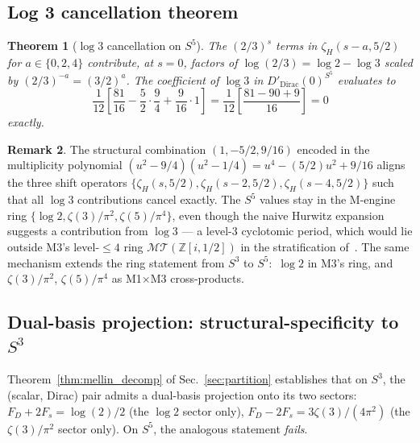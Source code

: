 \documentclass[11pt,a4paper]{article}
\theoremstyle{plain}
\newtheorem{theorem}{Theorem}[section]
\theoremstyle{definition}
\newtheorem{remark}[theorem]{Remark}
\newcommand{\Z}{\mathbb{Z}}
\begin{document}
\subsection{Log 3 cancellation theorem}

\begin{theorem}[$\log 3$ cancellation on $S^{5}$]
\label{thm:log3_cancellation}
The $(2/3)^{s}$ terms in $\zeta_{H}(s - a, 5/2)$ for
$a \in \{0, 2, 4\}$ contribute, at $s = 0$, factors of
$\log(2/3) = \log 2 - \log 3$ scaled by $(2/3)^{-a} = (3/2)^{a}$. The
coefficient of $\log 3$ in $D'_\text{Dirac}(0)^{S^{5}}$ evaluates to
\begin{equation}
\frac{1}{12}\left[\frac{81}{16} - \frac{5}{2}\cdot\frac{9}{4} + \frac{9}{16}\cdot 1\right]
= \frac{1}{12}\left[\frac{81 - 90 + 9}{16}\right] = 0
\end{equation}
exactly.
\end{theorem}

\begin{remark}
The structural combination $(1, -5/2, 9/16)$ encoded in the
multiplicity polynomial $(u^{2} - 9/4)(u^{2} - 1/4) = u^{4} - (5/2) u^{2} + 9/16$
aligns the three shift operators $\{\zeta_{H}(s, 5/2),
\zeta_{H}(s-2, 5/2), \zeta_{H}(s-4, 5/2)\}$ such that all $\log 3$
contributions cancel exactly. The $S^{5}$ values stay in the M-engine ring $\{\log 2, \zeta(3)/\pi^{2},
\zeta(5)/\pi^{4}\}$, even though the naive Hurwitz expansion suggests
a contribution from $\log 3$ --- a level-3 cyclotomic period, which
would lie outside M3's level-$\le 4$ ring
$\mathcal{MT}(\Z[i, 1/2])$ in the stratification of~\cite{paper18}. The
same mechanism extends the ring statement from $S^{3}$ to $S^{5}$:\
$\log 2$ in M3's ring, and $\zeta(3)/\pi^{2}$, $\zeta(5)/\pi^{4}$ as
M1$\times$M3 cross-products.
\end{remark}

\subsection{Dual-basis projection: structural-specificity to $S^{3}$}

Theorem~\ref{thm:mellin_decomp} of Sec.~\ref{sec:partition} establishes
that on $S^{3}$, the (scalar, Dirac) pair admits a dual-basis
projection onto its two sectors: $F_{D} + 2 F_{s} = \log(2)/2$ (the
$\log 2$ sector only), $F_{D} - 2 F_{s} = 3\zeta(3)/(4\pi^{2})$ (the
$\zeta(3)/\pi^{2}$ sector only). On $S^{5}$,
the analogous statement \emph{fails}.
\end{document}
